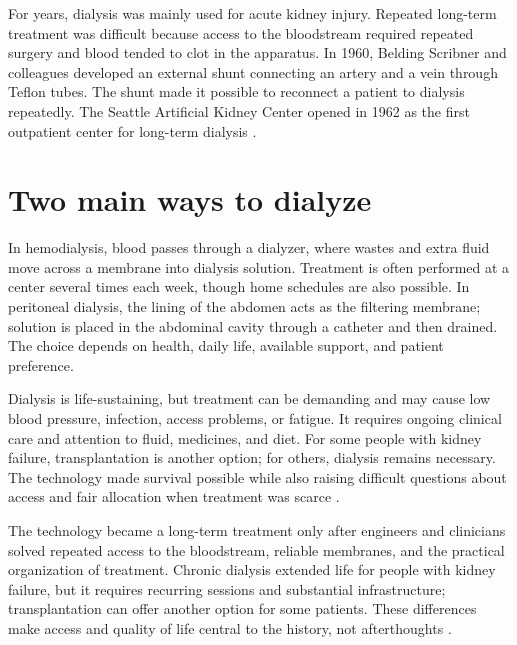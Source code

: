 \documentclass[12pt,oneside]{book}
\begin{document}
For years, dialysis was mainly used for acute kidney injury. Repeated
long-term treatment was difficult because access to the bloodstream
required repeated surgery and blood tended to clot in the apparatus. In
1960, Belding Scribner and colleagues developed an external shunt connecting
an artery and a vein through Teflon tubes. The shunt made it possible to
reconnect a patient to dialysis repeatedly. The Seattle Artificial Kidney
Center opened in 1962 as the first outpatient center for long-term dialysis
\cite{nwKidneyHistory,chronicHemodialysisHistory}.

\section{Two main ways to dialyze}
In hemodialysis, blood passes through a dialyzer, where wastes and extra
fluid move across a membrane into dialysis solution. Treatment is often
performed at a center several times each week, though home schedules are
also possible. In peritoneal dialysis, the lining of the abdomen acts as
the filtering membrane; solution is placed in the abdominal cavity through
a catheter and then drained. The choice depends on health, daily life,
available support, and patient preference.

Dialysis is life-sustaining, but treatment can be demanding and may cause
low blood pressure, infection, access problems, or fatigue. It requires
ongoing clinical care and attention to fluid, medicines, and diet. For some
people with kidney failure, transplantation is another option; for others,
dialysis remains necessary. The technology made survival possible while
also raising difficult questions about access and fair allocation when
treatment was scarce \cite{nwKidneyHistory,chronicHemodialysisHistory}.

The technology became a long-term treatment only after engineers and
clinicians solved repeated access to the bloodstream, reliable membranes, and
the practical organization of treatment. Chronic dialysis extended life for
people with kidney failure, but it requires recurring sessions and substantial
infrastructure; transplantation can offer another option for some patients.
These differences make access and quality of life central to the history, not
afterthoughts \cite{chronicHemodialysisHistory,nwkidneyDialysisMuseum}.
\end{document}
